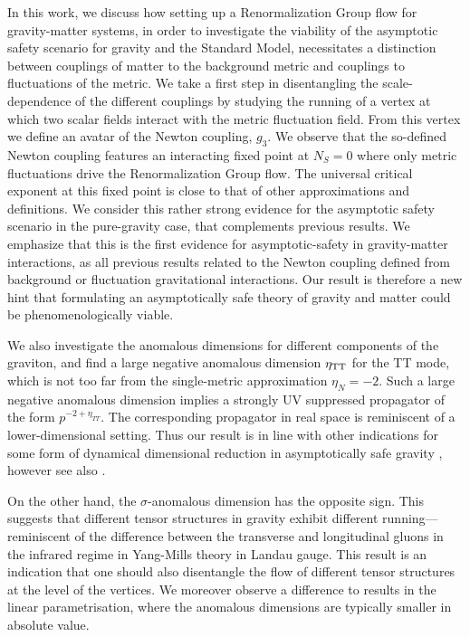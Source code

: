 \documentclass[11pt]{book}
\numberwithin{equation}{chapter}
\begin{document}
In this work, we discuss how setting up a Renormalization Group flow for gravity-matter systems,
in order to investigate the viability of the asymptotic safety scenario for gravity and the Standard Model,
necessitates a distinction between couplings of matter to the background metric and couplings to
fluctuations of the metric.
We take a first step in disentangling the scale-dependence of the different couplings by studying
the running of a vertex at which two scalar fields interact with the metric fluctuation field.
From this vertex we define an avatar of the Newton coupling, $g_3$.
We observe that the so-defined Newton coupling features an interacting fixed point at $N_S=0$
where only metric fluctuations drive the Renormalization Group flow.
The universal critical exponent at this fixed point is close to that of other approximations and definitions.
We consider this rather strong evidence for the asymptotic safety scenario  in the pure-gravity case,
that complements previous results.
We emphasize that this is the first evidence for asymptotic-safety in gravity-matter interactions,
as all previous results related to the Newton coupling defined from background or fluctuation
gravitational interactions.
Our result is therefore a new hint that formulating an asymptotically safe theory of gravity
and matter could be phenomenologically viable.

We also investigate the anomalous dimensions for different components of the graviton,
and find a large negative anomalous dimension $\eta_{\rm TT}$ for the TT mode,
which is not too far from the single-metric approximation $\eta_N=-2$.
Such a large negative anomalous dimension implies a strongly UV suppressed propagator of the form
$p^{-2+\eta_{TT}}$. The corresponding propagator in real space is reminiscent of a lower-dimensional setting.
Thus our result is in line with other indications for some form of dynamical dimensional reduction
in asymptotically safe gravity
\cite{Lauscher:2001ya, Lauscher:2005qz, Reuter:2011ah, Rechenberger:2012pm, Calcagni:2013vsa},
however see also \cite{DOdorico:2015jtl}.

On the other hand, the  $\sigma$-anomalous dimension has the opposite sign.
This suggests that different tensor structures in gravity exhibit different running---reminiscent
of the difference between the transverse and longitudinal gluons in the infrared regime
in Yang-Mills theory in Landau gauge.
This result is an indication that one should also disentangle the flow of different tensor structures
at the level of the vertices.
We moreover observe a difference to results in the linear parametrisation,
where the anomalous dimensions are typically smaller in  absolute value.
\end{document}

